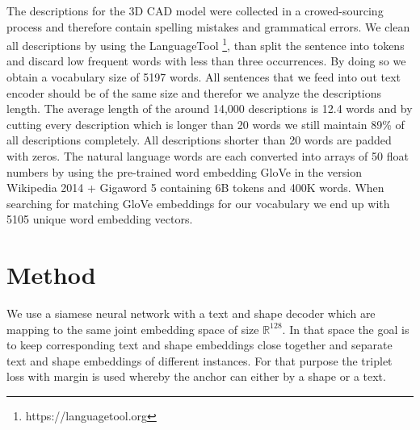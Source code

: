 \documentclass[10pt,twocolumn,letterpaper]{article}
\begin{document}
The descriptions for the 3D CAD model were collected in a crowed-sourcing process and therefore contain spelling mistakes and grammatical errors. We clean all descriptions by using the LanguageTool \footnote{https://languagetool.org}, than split the sentence into tokens and discard low frequent words with less than three occurrences. By doing so we obtain a vocabulary size of 5197 words. All sentences that we feed into out text encoder should be of the same size and therefor we analyze the descriptions length. The average length of the around 14,000 descriptions is 12.4 words and by cutting every description which is longer than 20 words we still maintain 89\% of all descriptions completely. All descriptions shorter than 20 words are padded with zeros. The natural language words are each converted into arrays of 50 float numbers by using the pre-trained word embedding GloVe \cite{pennington2014glove} in the version Wikipedia 2014 + Gigaword 5 containing 6B tokens and 400K words. When searching for matching GloVe embeddings for our vocabulary we end up with 5105 unique word embedding vectors.

\section{Method}
We use a siamese neural network with a text and shape decoder which are mapping to the same joint embedding space of size $\mathbb{R}^{128}$. In that space the goal is to keep corresponding text and shape embeddings close together and separate text and shape embeddings of different instances. For that purpose the triplet loss with margin is used whereby the anchor can either by a shape or a text. 
\end{document}
